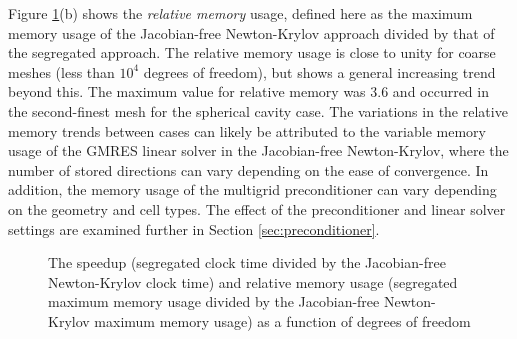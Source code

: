 \documentclass[sn-mathphys,Numbered]{sn-jnl}%
\begin{document}
Figure \ref{fig:speedup_rel_mem}(b) shows the \emph{relative memory} usage, defined here as the maximum memory usage of the Jacobian-free Newton-Krylov approach divided by that of the segregated approach.
The relative memory usage is close to unity for coarse meshes (less than $10^4$ degrees of freedom), but shows a general increasing trend beyond this.
The maximum value for relative memory was 3.6 and occurred in the second-finest mesh for the spherical cavity case.
The variations in the relative memory trends between cases can likely be attributed to the variable memory usage of the GMRES linear solver in the Jacobian-free Newton-Krylov, where the number of stored directions can vary depending on the ease of convergence.
In addition, the memory usage of the multigrid preconditioner can vary depending on the geometry and cell types.
The effect of the preconditioner and linear solver settings are examined further in Section \ref{sec:preconditioner}.
\begin{figure}[htbp]
   \centering
   \caption{The speedup (segregated clock time divided by the Jacobian-free Newton-Krylov clock time) and relative memory usage (segregated maximum memory usage divided by the Jacobian-free Newton-Krylov maximum memory usage) as a function of degrees of freedom}
   \label{fig:speedup_rel_mem}
\end{figure}
\end{document}
